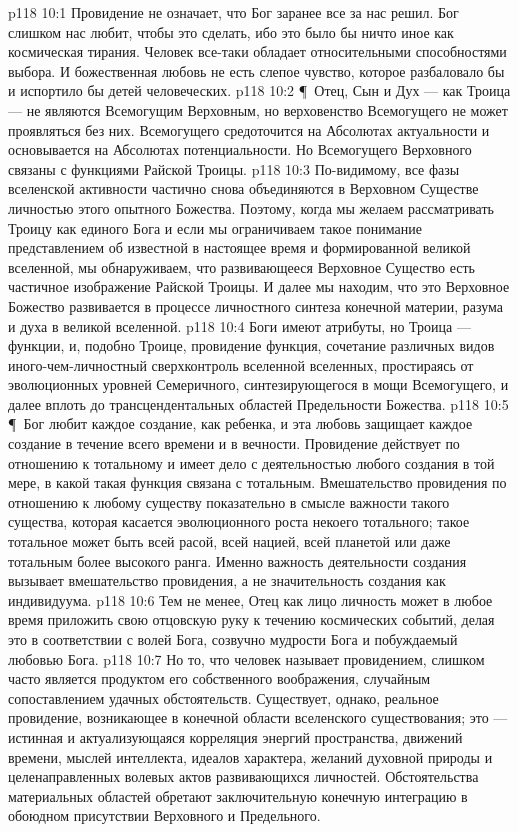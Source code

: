 \vs p118 10:1 Провидение не означает, что Бог заранее все за нас решил. Бог слишком нас любит, чтобы это сделать, ибо это было бы ничто иное как космическая тирания. Человек все\hyp{}таки обладает относительными способностями выбора. И божественная любовь не есть слепое чувство, которое разбаловало бы и испортило бы детей человеческих.
\vs p118 10:2 \P\ Отец, Сын и Дух --- как Троица --- не являются Всемогущим Верховным, но верховенство Всемогущего не может проявляться без них.  Всемогущего средоточится на Абсолютах актуальности и основывается на Абсолютах потенциальности. Но  Всемогущего Верховного связаны с функциями Райской Троицы.
\vs p118 10:3 По\hyp{}видимому, все фазы вселенской активности частично снова объединяются в Верховном Существе личностью этого опытного Божества. Поэтому, когда мы желаем рассматривать Троицу как единого Бога и если мы ограничиваем такое понимание представлением об известной в настоящее время и формированной великой вселенной, мы обнаруживаем, что развивающееся Верховное Существо есть частичное изображение Райской Троицы. И далее мы находим, что это Верховное Божество развивается в процессе личностного синтеза конечной материи, разума и духа в великой вселенной.
\vs p118 10:4 Боги имеют атрибуты, но Троица --- функции, и, подобно Троице, провидение  функция, сочетание различных видов иного\hyp{}чем\hyp{}личностный сверхконтроль вселенной вселенных, простираясь от эволюционных уровней Семеричного, синтезирующегося в мощи Всемогущего, и далее вплоть до трансцендентальных областей Предельности Божества.
\vs p118 10:5 \P\ Бог любит каждое создание, как ребенка, и эта любовь защищает каждое создание в течение всего времени и в вечности. Провидение действует по отношению к тотальному и имеет дело с деятельностью любого создания в той мере, в какой такая функция связана с тотальным. Вмешательство провидения по отношению к любому существу показательно в смысле важности  такого существа, которая касается эволюционного роста некоего тотального; такое тотальное может быть всей расой, всей нацией, всей планетой или даже тотальным более высокого ранга. Именно важность деятельности создания вызывает вмешательство провидения, а не значительность создания как индивидуума.
\vs p118 10:6 Тем не менее, Отец как лицо личность может в любое время приложить свою отцовскую руку к течению космических событий, делая это в соответствии с волей Бога, созвучно мудрости Бога и побуждаемый любовью Бога.
\vs p118 10:7 Но то, что человек называет провидением, слишком часто является продуктом его собственного воображения, случайным сопоставлением удачных обстоятельств. Существует, однако, реальное провидение, возникающее в конечной области вселенского существования; это --- истинная и актуализующаяся корреляция энергий пространства, движений времени, мыслей интеллекта, идеалов характера, желаний духовной природы и целенаправленных волевых актов развивающихся личностей. Обстоятельства материальных областей обретают заключительную конечную интеграцию в обоюдном присутствии Верховного и Предельного.
